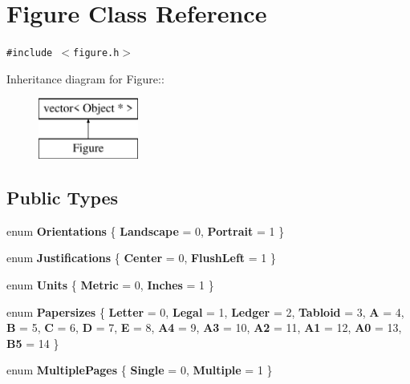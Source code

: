 \section{Figure Class Reference}
\label{classFigure}
{\tt \#include $<$figure.h$>$}

Inheritance diagram for Figure::\begin{figure}[H]
\begin{center}
\leavevmode
\includegraphics[height=2cm]{classFigure}
\end{center}
\end{figure}
\subsection*{Public Types}
\begin{CompactItemize}
\item 
enum {\bf Orientations} \{ {\bf Landscape} =  0, 
{\bf Portrait} =  1
 \}
\item 
enum {\bf Justifications} \{ {\bf Center} =  0, 
{\bf Flush\-Left} =  1
 \}
\item 
enum {\bf Units} \{ {\bf Metric} =  0, 
{\bf Inches} =  1
 \}
\item 
enum {\bf Papersizes} \{ {\bf Letter} =  0, 
{\bf Legal} =  1, 
{\bf Ledger} =  2, 
{\bf Tabloid} =  3, 
{\bf A} =  4, 
{\bf B} =  5, 
{\bf C} =  6, 
{\bf D} =  7, 
{\bf E} =  8, 
{\bf A4} =  9, 
{\bf A3} =  10, 
{\bf A2} =  11, 
{\bf A1} =  12, 
{\bf A0} =  13, 
{\bf B5} =  14
 \}
\item 
enum {\bf Multiple\-Pages} \{ {\bf Single} =  0, 
{\bf Multiple} =  1
 \}
\end{CompactItemize}
